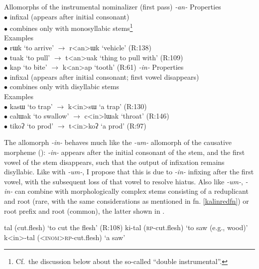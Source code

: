 \documentclass[output=paper]{langscibook}
\begin{document}
\ea Allomorphs of the instrumental nominalizer (first pass) \label{kalininstallos}
\ea \textit{-an-} \label{kalininstallosb}
\ea Properties\\
$\bullet$ infixal (appears after initial consonant)\\
$\bullet$ combines only with monosyllabic stems\footnote{Cf.\ the discussion below about the so-called ``double instrumental''.}\\
\ex Examples\\
$\bullet$ rɯk `to arrive' $\rightarrow$ r<an>ɯk `vehicle' \hfill (R:138)\\
$\bullet$ tuak `to pull' $\rightarrow$ t<an>uak `thing to pull with' \hfill (R:109)\\
$\bullet$ kap `to bite' $\rightarrow$ k<an>ap `tooth' \hfill (R:61)
\z
\ex \textit{-in-} \label{kalininstallosa}
\ea  Properties\\
$\bullet$ infixal (appears after initial consonant; first vowel disappears)\\
$\bullet$ combines only with disyllabic stems\\
\ex Examples\\
$\bullet$ kasɯ `to trap' $\rightarrow$ k<in>sɯ `a trap' \hfill (R:130)\\
$\bullet$ calɯak `to swallow' $\rightarrow$ c<in>lɯak `throat' \hfill (R:146)\\
$\bullet$ tikoʔ `to prod' $\rightarrow$ t<in>koʔ `a prod' \hfill (R:97)
\z
\z
\z

The allomorph \textit{-in-} behaves much like the \textit{-um-} allomorph of the causative morpheme (): \textit{-in-} appears after the initial consonant of the stem, and the first vowel of the stem disappears, such that the output of infixation remains disyllabic. Like with \textit{-um-}, I propose that this is due to \textit{-in-} infixing after the first vowel, with the subsequent loss of that vowel to resolve hiatus. Also like  \textit{-um-},  \textit{-in-} can combine with morphologically complex stems consisting of a reduplicant and root (rare, with the same considerations as mentioned in fn. \ref{kalinredfn}) or root prefix and root (common), the latter shown in \Next.

\ea
\ea tal (cut.flesh) \hfill `to cut the flesh' (R:108)
\ex ki-tal (\textsc{rp-}cut.flesh) \hfill `to saw (e.g., wood)' 
\ex k<in>-tal (\textsc{<inom>rp-}cut.flesh) \hfill `a saw' \label{kalinrpinstc}
\z
\z
\end{document}
